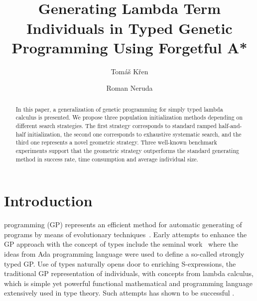 \documentclass[conference]{IEEEtran}
\begin{document}
\title{\ \\ \LARGE\bf 
Generating Lambda Term Individuals in Typed Genetic Programming Using Forgetful A*}

\author{Tom\'{a}\v{s} K\v{r}en \and Roman Neruda}


\maketitle

\begin{abstract}
In this paper, a generalization of genetic programming 
for simply typed lambda calculus is presented. We propose three population 
initialization methods depending on different search strategies. 
The first strategy corresponds to standard ramped half-and-half initialization, 
the second one corresponds to exhaustive systematic search, and the third one 
represents a novel geometric strategy. Three well-known benchmark experiments
support that the geometric strategy outperforms
the standard generating method in success rate, time consumption and average individual size. 
\end{abstract}

\section{Introduction}
 programming (GP) represents an efficient method for automatic generating of programs by means of evolutionary techniques~\cite{koza92,koza03}. Early attempts to enhance the GP approach with the concept of types include the seminal work~\cite{montana95} where the ideas from Ada programming language were used to define a so-called strongly typed GP.   
Use of types naturally opens door to enriching S-expressions,
the traditional GP representation of individuals, with concepts from
lambda calculus, which is simple yet powerful functional mathematical and programming 
language extensively used in type theory. Such attempts has shown to be 
successful \cite{yu01}. 
\end{document}
